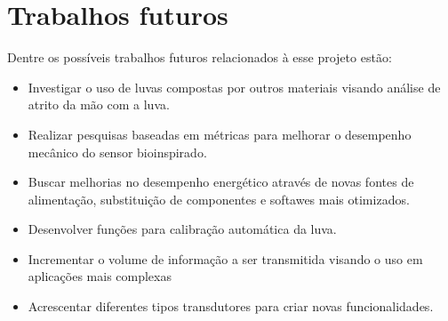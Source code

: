 \documentclass[
	12pt,				%
	openright,			%
	oneside,			%
	a4paper,			%
	english,			%
	brazil				%
	]{abntex2}
\begin{document}
			\section{Trabalhos futuros}		

		Dentre os possíveis trabalhos futuros relacionados à esse projeto estão:

		\begin{itemize}
			\item Investigar o uso de luvas compostas por outros materiais visando análise de atrito da mão com a luva.
			\item Realizar pesquisas baseadas em métricas para melhorar o desempenho mecânico do sensor bioinspirado.
			\item Buscar melhorias no desempenho energético através de novas fontes de alimentação, substituição de componentes e softawes mais otimizados.
			\item Desenvolver funções para calibração automática da luva.
			\item Incrementar o volume de informação a ser transmitida visando o uso em aplicações mais complexas
			\item Acrescentar diferentes tipos transdutores para criar novas funcionalidades.				
		\end{itemize}

		
\postextual



\printindex
\end{document}
